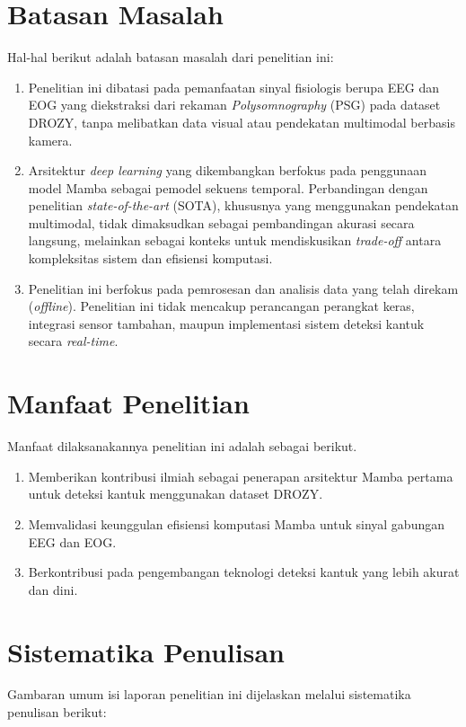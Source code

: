 \section{Batasan Masalah} \label{I.Batasan}
Hal-hal berikut adalah batasan masalah dari penelitian ini:
\begin{enumerate}
	\item Penelitian ini dibatasi pada pemanfaatan sinyal fisiologis berupa EEG dan EOG yang diekstraksi dari rekaman \textit{Polysomnography} (PSG) pada dataset DROZY, tanpa melibatkan data visual atau pendekatan multimodal berbasis kamera.
	\item Arsitektur \textit{deep learning} yang dikembangkan berfokus pada penggunaan model Mamba sebagai pemodel sekuens temporal. Perbandingan dengan penelitian \textit{state-of-the-art} (SOTA), khususnya yang menggunakan pendekatan multimodal, tidak dimaksudkan sebagai pembandingan akurasi secara langsung, melainkan sebagai konteks untuk mendiskusikan \textit{trade-off} antara kompleksitas sistem dan efisiensi komputasi.
	\item Penelitian ini berfokus pada pemrosesan dan analisis data yang telah direkam (\textit{offline}). Penelitian ini tidak mencakup perancangan perangkat keras, integrasi sensor tambahan, maupun implementasi sistem deteksi kantuk secara \textit{real-time}.
\end{enumerate}

\section{Manfaat Penelitian} \label{I.Manfaat}
Manfaat dilaksanakannya penelitian ini adalah sebagai berikut.
\begin{enumerate}
	\item Memberikan kontribusi ilmiah sebagai penerapan arsitektur Mamba pertama untuk deteksi kantuk menggunakan dataset DROZY.
	\item Memvalidasi keunggulan efisiensi komputasi Mamba untuk sinyal gabungan EEG dan EOG.
	\item Berkontribusi pada pengembangan teknologi deteksi kantuk yang lebih akurat dan dini.
\end{enumerate}


\section{Sistematika Penulisan} \label{I.Sistematika}
Gambaran umum isi laporan penelitian ini dijelaskan melalui sistematika penulisan berikut:

